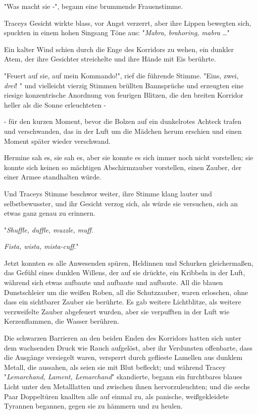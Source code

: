 {"Was macht sie -", begann eine brummende Frauenstimme.

Traceys Gesicht wirkte blass, vor Angst verzerrt, aber ihre Lippen bewegten sich, spuckten in einem hohen Singsang Töne aus: "\emph{Mabra, brahoring, mabra} …"

Ein kalter Wind schien durch die Enge des Korridors zu wehen, ein dunkler Atem, der ihre Gesichter streichelte und ihre Hände mit Eis berührte.

"Feuert auf sie, auf mein Kommando!", rief die führende Stimme. "Eins, zwei, \emph{drei}! " und vielleicht vierzig Stimmen brüllten Bannsprüche und erzeugten eine riesige konzentrische Anordnung von feurigen Blitzen, die den breiten Korridor heller als die Sonne erleuchteten -

- für den kurzen Moment, bevor die Bolzen auf ein dunkelrotes Achteck trafen und verschwanden, das in der Luft um die Mädchen herum erschien und einen Moment später wieder verschwand.

Hermine sah es, sie sah es, aber sie konnte es sich immer noch nicht vorstellen; sie konnte sich keinen so mächtigen Abschirmzauber vorstellen, einen Zauber, der einer Armee standhalten würde.

Und Traceys Stimme beschwor weiter, ihre Stimme klang lauter und selbstbewusster, und ihr Gesicht verzog sich, als würde sie versuchen, sich an etwas ganz genau zu erinnern.

"\emph{Shuffle, duffle, muzzle, muff}.

\emph{Fista, wista, mista-cuff}."

Jetzt konnten es alle Anwesenden spüren, Heldinnen und Schurken gleichermaßen, das Gefühl eines dunklen Willens, der auf sie drückte, ein Kribbeln in der Luft, während sich etwas aufbaute und aufbaute und aufbaute. All die blauen Dunstschleier um die weißen Roben, all die Schutzzauber, waren erloschen, ohne dass ein sichtbarer Zauber sie berührte. Es gab weitere Lichtblitze, als weitere verzweifelte Zauber abgefeuert wurden, aber sie verpufften in der Luft wie Kerzenflammen, die Wasser berühren.

Die schwarzen Barrieren an den beiden Enden des Korridors hatten sich unter dem wachsenden Druck wie Rauch aufgelöst, aber ihr Verdunsten offenbarte, dass die Ausgänge versiegelt waren, versperrt durch geflieste Lamellen aus dunklem Metall, die aussahen, als seien sie mit Blut befleckt; und während Tracey "\emph{Lemarchand, Lament, Lemarchand}" skandierte, begann ein furchtbares blaues Licht unter den Metalllatten und zwischen ihnen hervorzuleuchten; und die sechs Paar Doppeltüren knallten alle auf einmal zu, als panische, weißgekleidete Tyrannen begannen, gegen sie zu hämmern und zu heulen.

}
